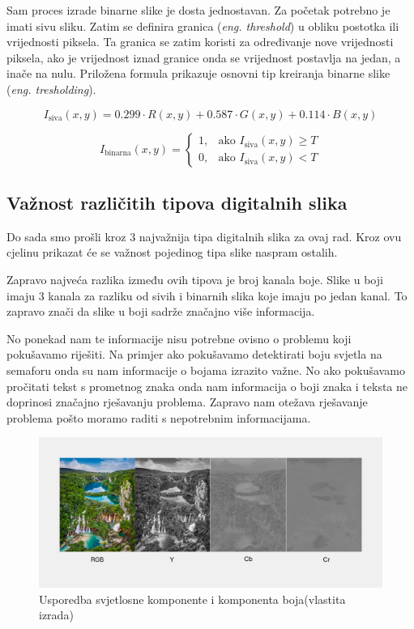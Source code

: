 \documentclass{foi}
\begin{document}
Sam proces izrade binarne slike je dosta jednostavan. Za početak potrebno je imati sivu sliku. Zatim se definira granica (\textit{eng. threshold}) u obliku postotka ili vrijednosti piksela. Ta granica se zatim koristi za određivanje nove vrijednosti piksela, ako je vrijednost iznad granice onda se vrijednost postavlja na jedan, a inače na nulu. Priložena formula prikazuje osnovni tip kreiranja binarne slike (\textit{eng. tresholding}).

{\large
    \[
I_{\text{siva}}(x, y) = 0.299 \cdot R(x, y) + 0.587 \cdot G(x, y) + 0.114 \cdot B(x, y)
\]

\[
I_{\text{binarna}}(x, y) =
\begin{cases}
1, & \text{ako } I_{\text{siva}}(x, y) \geq T \\
0, & \text{ako } I_{\text{siva}}(x, y) < T
\end{cases}
\]}


\subsection{Važnost različitih tipova digitalnih slika}

Do sada smo prošli kroz 3 najvažnija tipa digitalnih slika za ovaj rad. Kroz ovu cjelinu prikazat će se važnost pojedinog tipa slike naspram ostalih.

Zapravo najveća razlika između ovih tipova je broj kanala boje. Slike u boji imaju 3 kanala za razliku od sivih i binarnih slika koje imaju po jedan kanal. To zapravo znači da slike u boji sadrže značajno više informacija. 

No ponekad nam te informacije nisu potrebne ovisno o problemu koji pokušavamo riješiti. Na primjer ako pokušavamo detektirati boju svjetla na semaforu onda su nam informacije o bojama izrazito važne. No ako pokušavamo pročitati tekst s prometnog znaka onda nam informacija o boji znaka i teksta ne doprinosi značajno rješavanju problema. Zapravo nam otežava rješavanje problema pošto moramo raditi s nepotrebnim informacijama.

\begin{figure}[H]
    \centering
    \includegraphics[width=1.0\linewidth]{slike/Luminace vs chrominance.png}
    \caption{Usporedba svjetlosne komponente i komponenta boja(vlastita izrada)}
\end{figure}
\end{document}
